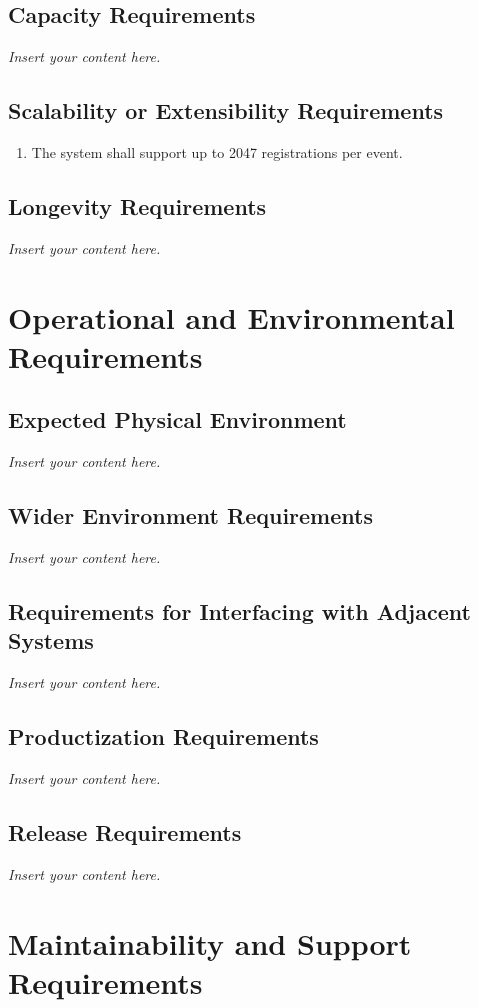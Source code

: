 \documentclass[12pt]{article}
\newcommand{\lips}{\textit{Insert your content here.}}
\begin{document}
\subsection{Capacity Requirements}
\lips
\subsection{Scalability or Extensibility Requirements}
\begin{enumerate}[align=left,
  leftmargin=*,
  labelsep=1em,
  itemindent=0em,
  label=\bfseries SE-\arabic*:]
  \item The system shall support up to 2047 registrations per event.
\end{enumerate}
\subsection{Longevity Requirements}
\lips

\section{Operational and Environmental Requirements}
\subsection{Expected Physical Environment}
\lips
\subsection{Wider Environment Requirements}
\lips
\subsection{Requirements for Interfacing with Adjacent Systems}
\lips
\subsection{Productization Requirements}
\lips
\subsection{Release Requirements}
\lips

\section{Maintainability and Support Requirements}
\end{document}
